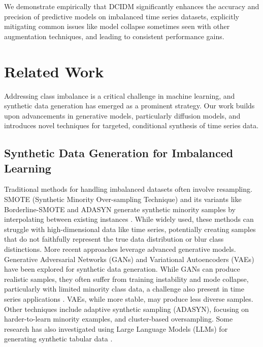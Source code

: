 \documentclass{article}
\begin{document}
We demonstrate empirically that DCIDM significantly enhances the accuracy and precision of predictive models on imbalanced time series datasets, explicitly mitigating common issues like model collapse sometimes seen with other augmentation techniques, and leading to consistent performance gains.




\section{Related Work}

Addressing class imbalance is a critical challenge in machine learning, and synthetic data generation has emerged as a prominent strategy. Our work builds upon advancements in generative models, particularly diffusion models, and introduces novel techniques for targeted, conditional synthesis of time series data.

\subsection{Synthetic Data Generation for Imbalanced Learning}
Traditional methods for handling imbalanced datasets often involve resampling. SMOTE (Synthetic Minority Over-sampling Technique) and its variants like Borderline-SMOTE and ADASYN generate synthetic minority samples by interpolating between existing instances \cite{Chawla_2002, 10.1007/11538059_91, 4633969}. While widely used, these methods can struggle with high-dimensional data like time series, potentially creating samples that do not faithfully represent the true data distribution or blur class distinctions.
More recent approaches leverage advanced generative models. Generative Adversarial Networks (GANs) \cite{Goodfellow_2014_GAN} and Variational Autoencoders (VAEs) \cite{Kingma_2013_VAE} have been explored for synthetic data generation. While GANs can produce realistic samples, they often suffer from training instability and mode collapse, particularly with limited minority class data, a challenge also present in time series applications \cite{li2022tts}. VAEs, while more stable, may produce less diverse samples. Other techniques include adaptive synthetic sampling (ADASYN), focusing on harder-to-learn minority examples, and cluster-based oversampling. Some research has also investigated using Large Language Models (LLMs) for generating synthetic tabular data \cite{Borisov_2023_LLMTabular}.
\end{document}
